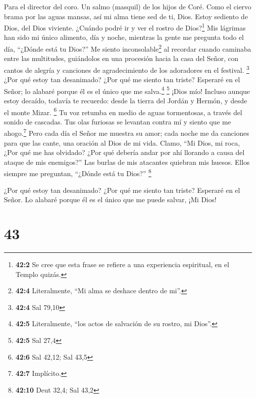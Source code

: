 Para el director del coro. Un salmo (masquil) de los hijos de Coré.
 Como el ciervo brama por las aguas mansas, así mi alma
tiene sed de ti, Dios.  Estoy sediento de Dios, del Dios
viviente. ¿Cuándo podré ir y ver el rostro de Dios?\footnote{\textbf{42:2}
  Se cree que esta frase se refiere a una experiencia espiritual, en el
  Templo quizás.}  Mis lágrimas han sido mi único
alimento, día y noche, mientras la gente me pregunta todo el día,
``¿Dónde está tu Dios?''  Me siento
inconsolable\footnote{\textbf{42:4} Literalmente, ``Mi alma se deshace
  dentro de mi''.} al recordar cuando caminaba entre las multitudes,
guiándolos en una procesión hacia la casa del Señor, con cantos de
alegría y canciones de agradecimiento de los adoradores en el festival.
\footnote{\textbf{42:4} Sal 79,10}  ¿Por qué estoy tan
desanimado? ¿Por qué me siento tan triste? Esperaré en el Señor; lo
alabaré porque él es el único que me salva.\footnote{\textbf{42:5}
  Literalmente, ``los actos de salvación de su rostro, mi Dios''.}
\footnote{\textbf{42:5} Sal 27,4}  ¡Dios mío! Incluso
aunque estoy decaído, todavía te recuerdo: desde la tierra del Jordán y
Hermón, y desde el monte Mizar. \footnote{\textbf{42:6} Sal 42,12; Sal
  43,5}  Tu voz retumba en medio de aguas tormentosas, a
través del sonido de cascadas. Tus olas furiosas se levantan contra mí y
siento que me ahogo.\footnote{\textbf{42:7} Implícito.} 
Pero cada día el Señor me muestra su amor; cada noche me da canciones
para que las cante, una oración al Dios de mi vida. 
Clamo, ``Mi Dios, mi roca, ¿Por qué me has olvidado? ¿Por qué debería
andar por ahí llorando a causa del ataque de mis enemigos?''
 Las burlas de mis atacantes quiebran mis huesos. Ellos
siempre me preguntan, ``¿Dónde está tu Dios?'' \footnote{\textbf{42:10}
  Deut 32,4; Sal 43,2}

 ¿Por qué estoy tan desanimado? ¿Por qué me siento tan
triste? Esperaré en el Señor. Lo alabaré porque él es el único que me
puede salvar, ¡Mi Dios!

\hypertarget{section-42}{%
\section{43}\label{section-42}}

